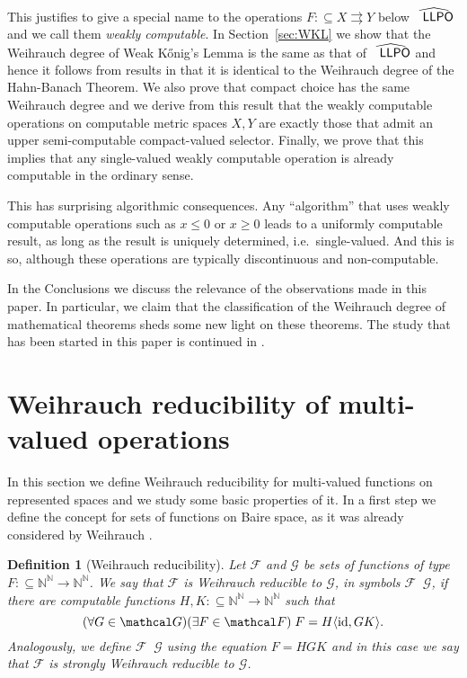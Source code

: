 \documentclass[jsl,10pt]{noasl}
\def\FF{{\mathcal F}}
\def\GG{{\mathcal G}}
\def\IN{{\mathbb{N}}}
\def\In{\subseteq}
\def\mto{\rightrightarrows}
\def\id{{\rm id}}
\def\LLPO{\text{\rm\sffamily LLPO}}
\def\LLPO{\text{\rm\sffamily LLPO}}
\def\leqW{\mathop{\leq_{\mathrm{W}}}}
\def\leqSW{\mathop{\leq_{\mathrm{sW}}}}
\newtheorem{definition}[proposition]{Definition}
\begin{document}
This justifies to give a special name to the operations $F:\In X\mto Y$ below $\widehat{\LLPO}$
and we call them {\em weakly computable}. In Section~\ref{sec:WKL}
we show that the Weihrauch
degree of Weak K\H{o}nig's Lemma is the same as that of $\widehat{\LLPO}$
and hence it follows from results in \cite{GM09} that it is identical
to the Weihrauch degree of the Hahn-Banach Theorem. 
We also prove that compact choice has the same Weihrauch degree and we
derive from this result that the weakly computable operations on computable
metric spaces $X,Y$ are exactly those that admit an upper semi-computable
compact-valued selector. Finally, we prove that this implies that
any single-valued weakly computable operation is already computable in the ordinary
sense.

This has surprising algorithmic consequences. Any ``algorithm'' that uses weakly computable
operations such as 
$x\leq0\mbox{ or }x\geq 0$
leads to a uniformly computable result, as long as the result is uniquely determined, i.e.\
single-valued. And this is so, although these operations are typically discontinuous
and non-computable.

In the Conclusions we discuss the relevance of the observations made in this
paper. In particular, we claim that the classification of the Weihrauch degree
of mathematical theorems sheds some new light on these theorems. 
The study that has been started in this paper is continued in \cite{BG09b}.


\section{Weihrauch reducibility of multi-valued operations}
\label{sec:reducibility}

In this section we define Weihrauch reducibility for multi-valued
functions on represented spaces and we study some basic properties of it.
In a first step we define the concept for sets of functions on Baire space,
as it was already considered by Weihrauch \cite{Wei92a,Wei92c}.

\begin{definition}[Weihrauch reducibility]\rm
Let $\mathcal F$ and $\mathcal G$ be sets of functions of type $F:\In\IN^\IN\to\IN^\IN$.
We say that $\FF$ is {\em Weihrauch reducible} to $\GG$,
in symbols $\mathcal F\leqW\mathcal G$, if there are computable 
functions $H,K:\In\IN^\IN\to\IN^\IN$ such that
\[(\forall G\in\mathcal G)(\exists F\in\mathcal F)\;F=H\langle\id,GK\rangle.\]
Analogously, we define $\FF\leqSW\GG$ using the equation $F=HGK$ and in this
case we say that $\FF$ is {\em strongly Weihrauch reducible} to $\GG$.
\end{definition}
\end{document}
